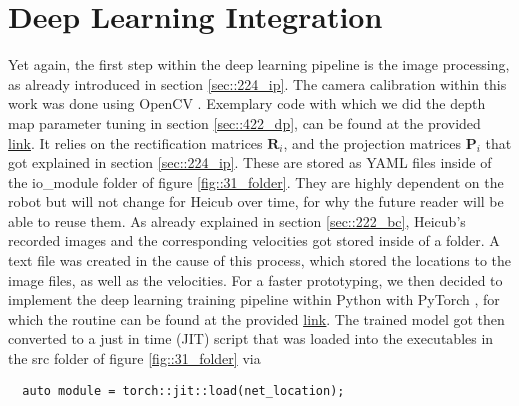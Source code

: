 \FloatBarrier
\section{Deep Learning Integration}
\label{sec::33_dl}
Yet again, the first step within the deep learning pipeline is the image processing, as already introduced in section  \ref{sec::224_ip}. The camera calibration within this work was done using OpenCV \cite{opencv_library}. Exemplary code with which we did the depth map parameter tuning in section \ref{sec::422_dp}, can be found at the provided \href{https://github.com/mhubii/nmpc_pattern_generator/blob/master/src/tune_disp_map.cpp}{\underline{link}}. It relies on the rectification matrices $\bm{R}_i$, and the projection matrices $\bm{P}_i$ that got explained in section \ref{sec::224_ip}. These are stored as YAML files inside of the io\_module folder of figure \ref{fig::31_folder}. They are highly dependent on the robot but will not change for Heicub over time, for why the future reader will be able to reuse them. As already explained in section \ref{sec::222_bc}, Heicub's recorded images and the corresponding velocities got stored inside of a folder. A text file was created in the cause of this process, which stored the locations to the image files, as well as the velocities. For a faster prototyping, we then decided to implement the deep learning training pipeline within Python with PyTorch \cite{paszke2017automatic}, for which the routine can be found at the provided \href{https://github.com/mhubii/nmpc_pattern_generator/blob/master/libs/learning/python/train_rgbd.py}{\underline{link}}. The trained model got then converted to a just in time (JIT) script that was loaded into the executables in the src folder of figure \ref{fig::31_folder} via
\begin{verbatim}
  auto module = torch::jit::load(net_location);
\end{verbatim}
